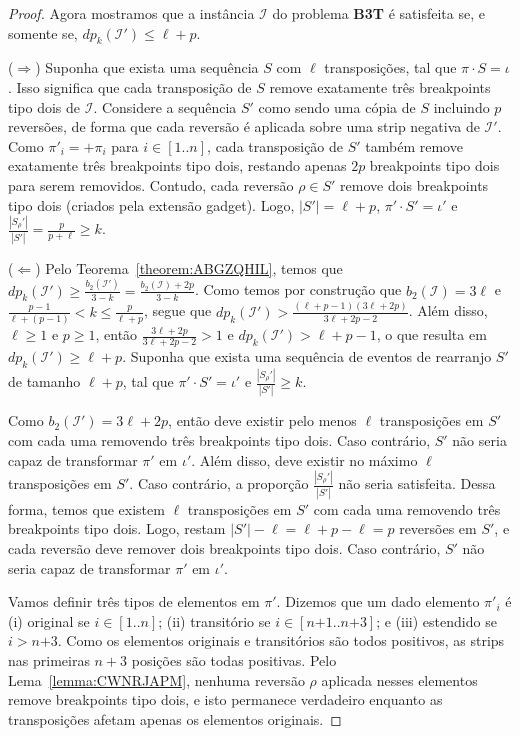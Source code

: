 \begin{proof}
Agora mostramos que a instância $\mathcal{I}$ do problema \textbf{B3T} é satisfeita se, e somente se, $dp_k(\mathcal{I'}) \le \ell+p$.

($\Rightarrow$) Suponha que exista uma sequência $S$ com $\ell$ transposições, tal que $\pi \cdot S = \iota$. Isso significa que cada transposição de $S$ remove exatamente três breakpoints tipo dois de $\mathcal{I}$. Considere a sequência $S'$ como sendo uma cópia de $S$ incluindo $p$ reversões, de forma que cada reversão é aplicada sobre uma strip negativa de $\mathcal{I'}$. Como $\pi'_i = +\pi_i$ para $i \in [1..n]$, cada transposição de $S'$ também remove exatamente três breakpoints tipo dois, restando apenas $2p$ breakpoints tipo dois para serem removidos. Contudo, cada reversão $\rho \in S'$ remove dois breakpoints tipo dois (criados pela extensão gadget). Logo, $|S'| = \ell+p$, $\pi' \cdot S' = \iota'$ e $\frac{|S_{\rho}'|}{|S'|} = \frac{p}{p+\ell} \ge k$.

($\Leftarrow$) Pelo Teorema~\ref{theorem:ABGZQHIL}, temos que $dp_k(\mathcal{I'}) \ge \frac{b_2(\mathcal{I'})}{3-k} = \frac{b_2(\mathcal{I})+2p}{3-k}$. Como temos por construção que $b_2(\mathcal{I}) = 3\ell$ e $\frac{p-1}{\ell+(p-1)} < k \leq \frac{p}{\ell+p}$, segue que $dp_k(\mathcal{I'}) > \frac{(\ell+p-1)(3\ell+2p)}{3\ell+2p-2}$. Além disso, $\ell \geq 1$ e $p \geq 1$, então $\frac{3\ell+2p}{3\ell+2p-2} > 1$ e $dp_k(\mathcal{I'}) > \ell+p-1$, o que resulta em $dp_k(\mathcal{I'}) \ge \ell + p$. Suponha que exista uma sequência de eventos de rearranjo $S'$ de tamanho $\ell + p$, tal que $\pi' \cdot S' = \iota'$ e $\frac{|S_{\rho}'|}{|S'|} \ge k$.

Como $b_2(\mathcal{I'}) = 3\ell+2p$, então deve existir pelo menos $\ell$ transposições em $S'$ com cada uma removendo três breakpoints tipo dois. Caso contrário, $S'$ não seria capaz de transformar $\pi'$ em $\iota'$. Além disso, deve existir no máximo $\ell$ transposições em $S'$. Caso contrário, a proporção $\frac{|S_{\rho}'|}{|S'|}$ não seria satisfeita. Dessa forma, temos que existem $\ell$ transposições em $S'$ com cada uma removendo três breakpoints tipo dois. Logo, restam $|S'| - \ell = \ell+p - \ell = p$ reversões em $S'$, e cada reversão deve remover dois breakpoints tipo dois. Caso contrário, $S'$ não seria capaz de transformar $\pi'$ em $\iota'$.

Vamos definir três tipos de elementos em $\pi'$. Dizemos que um dado elemento $\pi'_i$ é (i) original se $i \in [1..n]$; (ii) transitório se $i \in [n{+1}..n{+3}]$; e (iii) estendido se $i > n{+3}$. Como os elementos originais e transitórios são todos positivos, as strips nas primeiras $n+3$ posições são todas positivas. Pelo Lema~\ref{lemma:CWNRJAPM}, nenhuma reversão $\rho$ aplicada nesses elementos remove breakpoints tipo dois, e isto permanece verdadeiro enquanto as transposições afetam apenas os elementos originais.


\end{proof}
